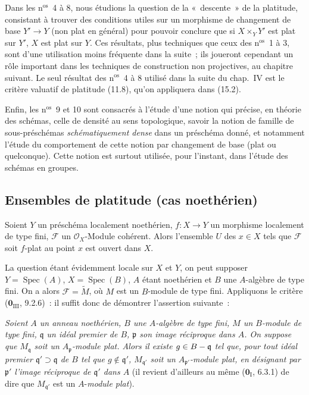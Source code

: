 Dans les n$^\mathrm{os}$~4 à 8, nous étudions la question de la «~descente~» de
la platitude, consistant à trouver des conditions utiles sur un morphisme de
changement de base $Y'\to Y$ (non plat en général) pour pouvoir conclure que si
$X\times_YY'$ est plat sur $Y'$, $X$ est plat sur $Y$. Ces résultats, plus
techniques que ceux des n$^\mathrm{os}$~1 à 3, sont d'une utilisation moins
fréquente dans la suite~; ils joueront cependant un rôle important dans les
techniques de construction non projectives, au chapitre suivant. Le seul
résultat des n$^\mathrm{os}$~4 à 8 utilisé dans la suite du chap.~IV est le
critère valuatif de platitude (11.8), qu'on appliquera dans (15.2).

Enfin, les n$^\mathrm{os}$~9 et 10 sont consacrés à l'étude d'une notion qui
précise, en théorie des schémas, celle de densité au sens topologique, savoir la
notion de famille de sous-préschémas \emph{schématiquement dense} dans un
préschéma donné, et notamment l'étude du comportement de cette notion par
changement de base (plat ou quelconque). Cette notion est surtout utilisée,
pour l'instant, dans l'étude des schémas en groupes.

\subsection{Ensembles de platitude (cas noethérien)}
\label{subsection:IV.11.1-fr}

\begin{theorem}[11.1.1]
\label{IV.11.1.1-fr}
Soient $Y$ un préschéma localement noethérien, $f:X\to Y$ un morphisme
localement de type fini, $\mathcal F$ un $\mathcal O_X$-Module cohérent. Alors
l'ensemble $U$ des $x\in X$ tels que $\mathcal F$ soit $f$-plat au point $x$
est ouvert dans $X$.
\end{theorem}

La question étant évidemment locale sur $X$ et $Y$, on peut supposer
$Y=\operatorname{Spec}(A)$, $X=\operatorname{Spec}(B)$, $A$ étant noethérien et
$B$ une $A$-algèbre de type fini. On a alors $\mathcal F=\widetilde M$, où $M$
est un $B$-module de type fini. Appliquons le critère
($\mathbf 0_{\mathrm{III}}$, 9.2.6)~: il suffit donc de démontrer l'assertion
suivante~:

\begin{env}[11.1.1.1]
\label{IV.11.1.1.1-fr}
\emph{Soient $A$ un anneau noethérien, $B$ une $A$-algèbre de type fini, $M$ un
$B$-module de type fini, $\mathfrak q$ un idéal premier de $B$, $\mathfrak p$
son image réciproque dans $A$. On suppose que $M_{\mathfrak q}$ soit un
$A_{\mathfrak p}$-module plat. Alors il existe $g\in B-\mathfrak q$ tel que,
pour tout idéal premier $\mathfrak q'\supset\mathfrak q$ de $B$ tel que
$g\notin\mathfrak q'$, $M_{\mathfrak q'}$ soit un
$A_{\mathfrak p'}$-module plat, en désignant par $\mathfrak p'$ l'image
réciproque de $\mathfrak q'$ dans $A$} (il revient d'ailleurs au même
($\mathbf 0_{\mathrm I}$, 6.3.1) de dire que $M_{\mathfrak q'}$ est un
$A$-\emph{module plat}).
\end{env}

